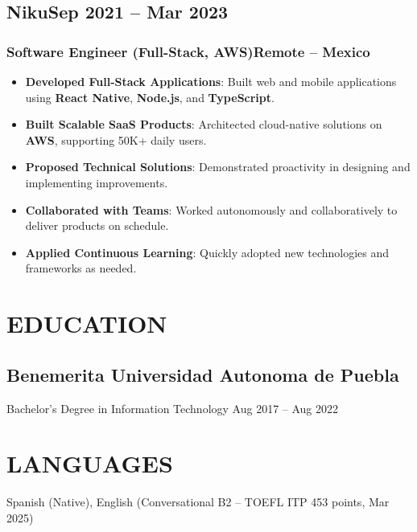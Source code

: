 \documentclass[a4paper,10pt]{article}
\newcommand{\tech}[1]{\textbf{\textcolor{tech}{#1}}}
\begin{document}
\subsection*{Niku\hfill\textbf{Sep 2021 -- Mar 2023}}
\subsubsection*{Software Engineer (Full-Stack, AWS)\hfill Remote -- Mexico}
\begin{itemize}[noitemsep, leftmargin=*]
    \item \textbf{Developed Full-Stack Applications}: Built web and mobile applications using \tech{React Native}, \tech{Node.js}, and \tech{TypeScript}.
    \item \textbf{Built Scalable SaaS Products}: Architected cloud-native solutions on \tech{AWS}, supporting 50K+ daily users.
    \item \textbf{Proposed Technical Solutions}: Demonstrated proactivity in designing and implementing improvements.
    \item \textbf{Collaborated with Teams}: Worked autonomously and collaboratively to deliver products on schedule.
    \item \textbf{Applied Continuous Learning}: Quickly adopted new technologies and frameworks as needed.
\end{itemize}

\section*{EDUCATION}

\subsection*{Benemerita Universidad Autonoma de Puebla}
Bachelor's Degree in Information Technology \hfill Aug 2017 -- Aug 2022

\section*{LANGUAGES}
Spanish (Native), English (Conversational B2 -- TOEFL ITP 453 points, Mar 2025)
\end{document}
